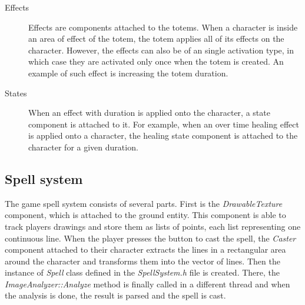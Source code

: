 \begin{description}
\item [Effects]  Effects are components attached to the totems. When a character is inside an area of effect of the totem, the totem applies all of its effects on the character. However, the effects can also be of an single activation type, in which case they are activated only once when the totem is created. An example of such effect is increasing the totem duration.

\item [States] When an effect with duration is applied onto the character, a state component is attached to it. For example, when an over time healing effect is applied onto a character, the healing state component is attached to the character for a given duration.

\end{description}

\subsection{Spell system}
The game spell system consists of several parts. First is the \emph{DrawableTexture} component, which is attached to the ground entity. This component is able to track players drawings and store them as lists of points, each list representing one continuous line. When the player presses the button to cast the spell, the \emph{Caster} component attached to their character extracts the lines in a rectangular area around the character and transforms them into the vector of lines. Then the instance of \emph{Spell} class defined in the \emph{SpellSystem.h} file is created. There, the \emph{ImageAnalyzer::Analyze} method is finally called in a different thread and when the analysis is done, the result is parsed and the spell is cast.